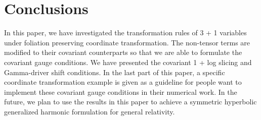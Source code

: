 \documentclass[letterpaper,nofootinbib,prd,amsmath,onecolumn]{revtex4-1}
\begin{document}
\section{Conclusions}
In this paper, we have investigated the transformation rules of 3 + 1 variables under foliation preserving coordinate transformation. The non-tensor terms are modified to their covariant counterparts so that we are able to formulate the covariant gauge conditions. We have presented the covariant 1 + log slicing and Gamma-driver shift conditions. In the last part of this paper, a specific coordinate transformation example is given as a guideline for people want to implement these covariant gauge conditions in their numerical work. In the future, we plan to use the results in this paper to achieve a symmetric hyperbolic generalized harmonic formulation for general relativity.  



\end{document}
